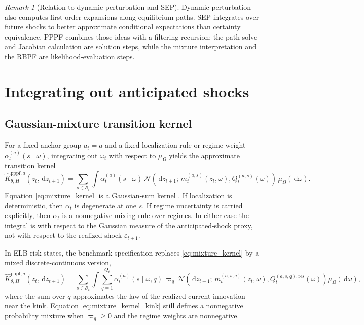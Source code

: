 \documentclass[11pt]{article}
\theoremstyle{remark}
\newtheorem{remark}{Remark}
\newcommand{\dd}{\,\mathrm{d}}
\begin{document}
\begin{remark}[Relation to dynamic perturbation and SEP]
Dynamic perturbation \citep{MennuniRubioRamirezStepanchuk2025} also computes first-order expansions along equilibrium paths.
SEP \citep{AdjemianJuillard2025} integrates over future shocks to better approximate conditional expectations than certainty equivalence.
PPPF combines those ideas with a filtering recursion: the path solve and Jacobian calculation are solution steps, while the mixture interpretation and the RBPF are likelihood-evaluation steps.
\end{remark}

\section{Integrating out anticipated shocks}
\label{sec:mixture}

\subsection{Gaussian-mixture transition kernel}

For a fixed anchor group $a_t=a$ and a fixed localization rule or regime weight $\alpha_t^{(a)}(s\mid \omega)$, integrating out $\omega_t$ with respect to $\mu_\Omega$ yields the approximate transition kernel
\begin{equation}
\widehat K_{\theta,H}^{\mathrm{pppf},a}(z_t,\dd z_{t+1})
=
\sum_{s\in\mathcal{S}_t}
\int
\alpha_t^{(a)}(s\mid \omega)\,
\mathcal{N}\!\left(\dd z_{t+1};\,m_t^{(a,s)}(z_t,\omega),Q_t^{(a,s)}(\omega)\right)\,
\mu_\Omega(\dd\omega).
\label{eq:mixture_kernel}
\end{equation}
Equation \eqref{eq:mixture_kernel} is a Gaussian-sum kernel \citep{AlspachSorenson1972}.
If localization is deterministic, then $\alpha_t$ is degenerate at one $s$.
If regime uncertainty is carried explicitly, then $\alpha_t$ is a nonnegative mixing rule over regimes.
In either case the integral is with respect to the Gaussian measure of the anticipated-shock proxy, not with respect to the realized shock $\varepsilon_{t+1}$.

In ELB-risk states, the benchmark specification replaces \eqref{eq:mixture_kernel} by a mixed discrete-continuous version,
\begin{equation}
\widehat K_{\theta,H}^{\mathrm{pppf},a}(z_t,\dd z_{t+1})
=
\sum_{s\in\mathcal{S}_t}\int \sum_{q=1}^{Q_t}
\alpha_t^{(a)}(s\mid \omega,q)\,\varpi_q\,
\mathcal{N}\!\left(\dd z_{t+1};\,m_t^{(a,s,q)}(z_t,\omega),Q_t^{(a,s,q),\mathrm{res}}(\omega)\right)
\mu_\Omega(\dd\omega),
\label{eq:mixture_kernel_kink}
\end{equation}
where the sum over $q$ approximates the law of the realized current innovation near the kink.
Equation \eqref{eq:mixture_kernel_kink} still defines a nonnegative probability mixture when $\varpi_q\ge 0$ and the regime weights are nonnegative.
\end{document}
